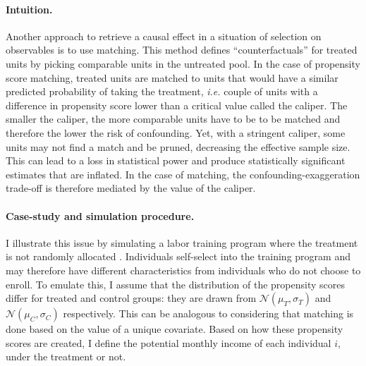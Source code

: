 \documentclass[usletter, 12pt]{article}
\begin{document}
			\paragraph{Intuition.} Another approach to retrieve a causal effect in a situation of selection on observables is to use matching. This method defines ``counterfactuals'' for treated units by picking comparable units in the untreated pool. 
			In the case of propensity score matching, treated units are matched to units that would have a similar predicted probability of taking the treatment, \textit{i.e.} couple of units with a difference in propensity score lower than a critical value called the caliper. The smaller the caliper, the more comparable units have to be to be matched and therefore the lower the risk of confounding. Yet, with a stringent caliper, some units may not find a match and be pruned, decreasing the effective sample size. This can lead to a loss in statistical power and produce statistically significant estimates that are inflated. In the case of matching, the confounding-exaggeration trade-off is therefore mediated by the value of the caliper.
                
       	 	\paragraph{Case-study and simulation procedure.} I illustrate this issue by simulating a labor training program where the treatment is not randomly allocated \citep{dehejia_causal_1999}. Individuals self-select into the training program and may therefore have different characteristics from individuals who do not choose to enroll. To emulate this, I assume that the distribution of the propensity scores differ for treated and control groups: they are drawn from $\mathcal{N}(\mu_T,\sigma_T)$ and $\mathcal{N}(\mu_C, \sigma_C)$ respectively. This can be analogous to considering that matching is done based on the value of a unique covariate. Based on how these propensity scores are created, I define the potential monthly income of each individual $i$, under the treatment or not.%
        
\end{document}
